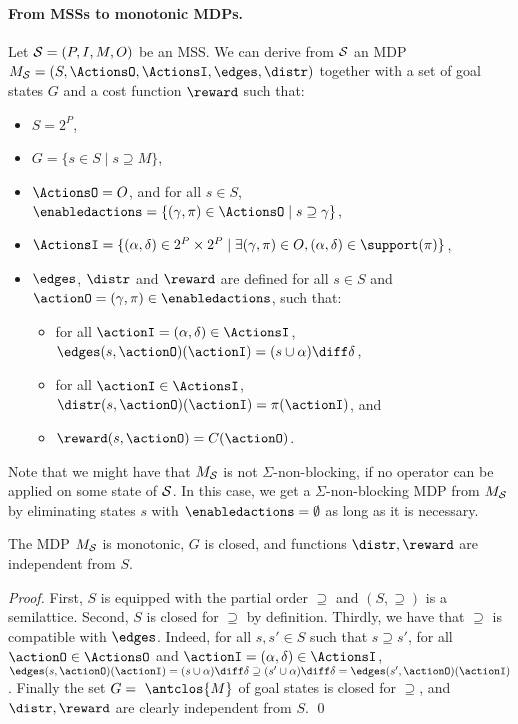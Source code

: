 \paragraph{From MSSs to monotonic MDPs.} Let ${\cal S} = (P, I, M, O)$ be an MSS. We can derive from ${\cal S}$ an MDP $M_{\cal S} = (S, \ActionsO, \ActionsI, \edges, \distr)$ together with a set of goal states $G$ and a cost function $\reward$ such that:
\begin{itemize}
\itemsep0.1em
\item $S = 2^P$,
\item $G = \{s \in S \mid s \supseteq M\}$,
\item $\ActionsO = O$, and for all $s \in S$, $\enabledactions = \{(\gamma, \pi) \in \ActionsO \mid s \supseteq \gamma\}$,
\item $\ActionsI = \{(\alpha, \delta) \in 2^P\times2^P \mid \exists (\gamma, \pi) \in O, (\alpha, \delta) \in \support(\pi)\}$,
\item $\edges$, $\distr$ and $\reward$ are defined for all $s \in S$ and $\actionO = (\gamma, \pi) \in \enabledactions$, such that:
\begin{itemize} 
\item for all $\actionI = (\alpha, \delta) \in \ActionsI$, $\edges(s, \actionO)(\actionI) = (s \cup \alpha) \diff \delta$,
\item for all $\actionI \in \ActionsI$, $\distr(s, \actionO)(\actionI) = \pi(\actionI)$, and
\item $\reward(s, \actionO) = C(\actionO)$.
\end{itemize}
\end{itemize}
Note that we might have that $M_{\cal S}$ is not $\Sigma$-non-blocking, if no operator can be applied on some state of $\cal S$. In this case, we get a $\Sigma$-non-blocking MDP from $M_{\cal S}$ by eliminating states $s$ with $\enabledactions = \emptyset$  as long as it is necessary.

\begin{lemma} \label{lem:StripsMono}
The MDP $M_{\cal S}$ is monotonic, $G$ is closed, and functions $\distr, \reward$ are independent from $S$.
\end{lemma}
\begin{proof}
First, $S$ is equipped with the partial order $\supseteq$ and $(S, \supseteq)$ is a semilattice. Second, $S$ is closed for $\supseteq$ by definition. 
Thirdly,  we have that $\supseteq$ is compatible with $\edges$. Indeed, for all $s, s' \in S$ such that $s \supseteq s'$, for all $\actionO \in \ActionsO$ and $\actionI = (\alpha, \delta) \in \ActionsI$, $\edges(s, \actionO)(\actionI) = (s \cup \alpha)\diff \delta \supseteq (s' \cup \alpha) \diff \delta = \edges(s', \actionO)(\actionI)$. Finally the set $G =\ \antclos\{M\}$ of goal states is closed for $\supseteq$, and $\distr, \reward$ are clearly independent from $S$.
\qed\end{proof}

